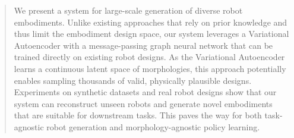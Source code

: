 \documentclass{article}
\theoremstyle{plain}
\theoremstyle{definition}
\theoremstyle{remark}
\begin{document}



\printAffiliationsAndNotice{}  %

\begin{abstract}
We present a system for large-scale generation of diverse robot embodiments. Unlike existing approaches that rely on prior knowledge and thus limit the embodiment design space, our system leverages a Variational Autoencoder with a message-passing graph neural network that can be trained directly on existing robot designs. As the Variational Autoencoder learns a continuous latent space of morphologies, this approach potentially enables sampling thousands of valid, physically plausible designs. Experiments on synthetic datasets and real robot designs show that our system can reconstruct unseen robots and generate novel embodiments that are suitable for downstream tasks. This paves the way for both task-agnostic robot generation and morphology-agnostic policy learning.
\end{abstract}
\end{document}
